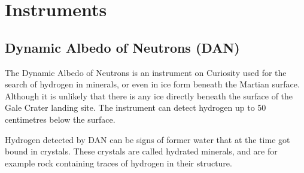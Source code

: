 \section*{Instruments}
\subsection*{Dynamic Albedo of Neutrons (DAN)}
The Dynamic Albedo of Neutrons is an instrument on Curiosity used for the search of hydrogen in minerals, or even in ice form beneath the Martian surface.
Although it is unlikely that there is any ice directly beneath the surface of the Gale Crater landing site.
The instrument can detect hydrogen up to 50 centimetres below the surface.

Hydrogen detected by DAN can be signs of former water that at the time got bound in crystals.
These crystals are called hydrated minerals, and are for example rock containing traces of hydrogen in their structure.